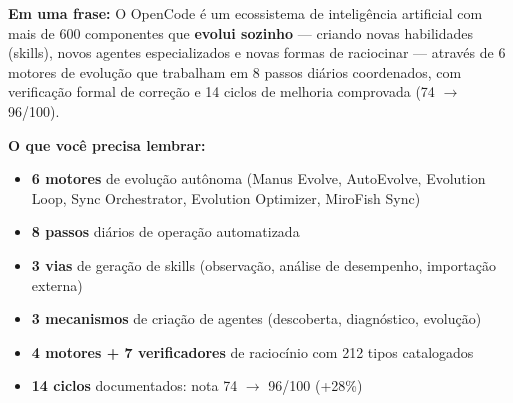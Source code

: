 \documentclass[
  article,
  12pt,
  oneside,
  a4paper,
  brazil,
  sumario=tradicional
]{abntex2}
\begin{document}
\begin{resumobox}
\textbf{Em uma frase:} O OpenCode é um ecossistema de inteligência artificial com mais de 600 componentes que \textbf{evolui sozinho} --- criando novas habilidades (skills), novos agentes especializados e novas formas de raciocinar --- através de 6 motores de evolução que trabalham em 8 passos diários coordenados, com verificação formal de correção e 14 ciclos de melhoria comprovada (74 $\rightarrow$ 96/100).

\vspace{4pt}
\noindent\textbf{O que você precisa lembrar:}
\begin{itemize}
  \item \textbf{6 motores} de evolução autônoma (Manus Evolve, AutoEvolve, Evolution Loop, Sync Orchestrator, Evolution Optimizer, MiroFish Sync)
  \item \textbf{8 passos} diários de operação automatizada
  \item \textbf{3 vias} de geração de skills (observação, análise de desempenho, importação externa)
  \item \textbf{3 mecanismos} de criação de agentes (descoberta, diagnóstico, evolução)
  \item \textbf{4 motores + 7 verificadores} de raciocínio com 212 tipos catalogados
  \item \textbf{14 ciclos} documentados: nota 74 $\rightarrow$ 96/100 (+28\%)
\end{itemize}
\end{resumobox}

\postextual

\end{document}
